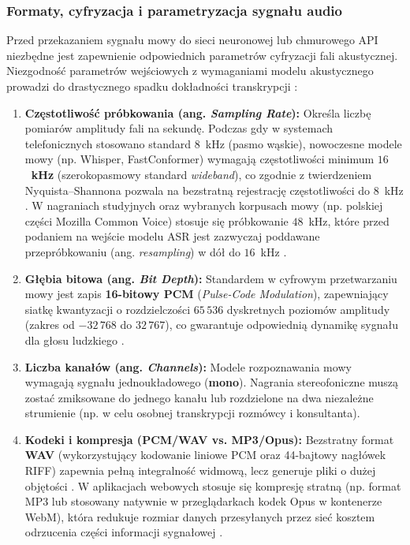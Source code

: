 \subsubsection{Formaty, cyfryzacja i parametryzacja sygnału audio}
\begin{sloppypar}
Przed przekazaniem sygnału mowy do sieci neuronowej lub chmurowego API niezbędne jest zapewnienie odpowiednich parametrów cyfryzacji fali akustycznej. Niezgodność parametrów wejściowych z wymaganiami modelu akustycznego prowadzi do drastycznego spadku dokładności transkrypcji \cite[s.~349]{jurafsky2026}:
\end{sloppypar}

\begin{enumerate}
\item \textbf{Częstotliwość próbkowania (ang. \textit{Sampling Rate}):} Określa liczbę pomiarów amplitudy fali na sekundę. Podczas gdy w systemach telefonicznych stosowano standard $8$~kHz (pasmo wąskie), nowoczesne modele mowy (np. Whisper, FastConformer) wymagają częstotliwości minimum \textbf{$16$~kHz} (szerokopasmowy standard \textit{wideband}), co zgodnie z twierdzeniem Nyquista--Shannona pozwala na bezstratną rejestrację częstotliwości do $8$~kHz \cite[s.~339]{jurafsky2026}. W nagraniach studyjnych oraz wybranych korpusach mowy (np. polskiej części Mozilla Common Voice) stosuje się próbkowanie $48$~kHz, które przed podaniem na wejście modelu ASR jest zazwyczaj poddawane przepróbkowaniu (ang. \textit{resampling}) w dół do $16$~kHz \cite[s.~318]{pondel2024e2e}.

\item \textbf{Głębia bitowa (ang. \textit{Bit Depth}):} Standardem w cyfrowym przetwarzaniu mowy jest zapis \textbf{16-bitowy PCM} (\textit{Pulse-Code Modulation}), zapewniający siatkę kwantyzacji o rozdzielczości $65\,536$ dyskretnych poziomów amplitudy (zakres od $-32\,768$ do $32\,767$), co gwarantuje odpowiednią dynamikę sygnału dla głosu ludzkiego \cite[s.~339]{jurafsky2026}.

\item \textbf{Liczba kanałów (ang. \textit{Channels}):} Modele rozpoznawania mowy wymagają sygnału jednoukładowego (\textbf{mono}). Nagrania stereofoniczne muszą zostać zmiksowane do jednego kanału lub rozdzielone na dwa niezależne strumienie (np. w celu osobnej transkrypcji rozmówcy i konsultanta).

\item \textbf{Kodeki i kompresja (PCM/WAV vs. MP3/Opus):} Bezstratny format \textbf{WAV} (wykorzystujący kodowanie liniowe PCM oraz 44-bajtowy nagłówek RIFF) zapewnia pełną integralność widmową, lecz generuje pliki o dużej objętości \cite[s.~339--340]{jurafsky2026}. W aplikacjach webowych stosuje się kompresję stratną (np. format MP3 lub stosowany natywnie w przeglądarkach kodek Opus w kontenerze WebM), która redukuje rozmiar danych przesyłanych przez sieć kosztem odrzucenia części informacji sygnałowej \cite[s.~339]{jurafsky2026}.
\end{enumerate}
